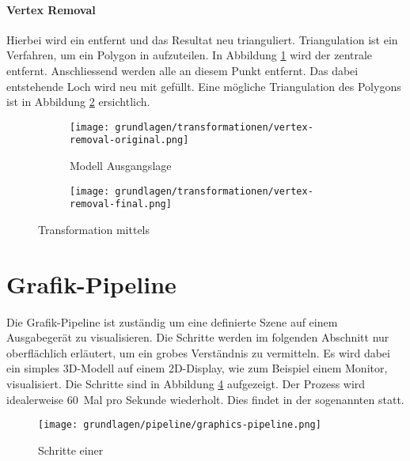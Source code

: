 \paragraph{Vertex Removal}
Hierbei wird ein  entfernt und das Resultat neu trianguliert. Triangulation ist ein Verfahren, um ein Polygon in  aufzuteilen.
In Abbildung \ref{fig:transformationVertexRemovalOriginal} wird der zentrale  entfernt. Anschliessend werden alle  an diesem Punkt entfernt. Das dabei entstehende Loch wird neu mit  gefüllt. Eine mögliche Triangulation des Polygons ist in Abbildung \ref{fig:transformationVertexRemovalFinal} ersichtlich.

\begin{figure}[H]
  \centering
  \begin{subfigure}{.5\textwidth}
    \centering
    \texttt{[image: grundlagen/transformationen/vertex-removal-original.png]}
    \caption{Modell Ausgangslage}
    \label{fig:transformationVertexRemovalOriginal}
  \end{subfigure}%
  \begin{subfigure}{.5\textwidth}
    \centering
    \texttt{[image: grundlagen/transformationen/vertex-removal-final.png]}
    \caption{}
    \label{fig:transformationVertexRemovalFinal}
  \end{subfigure}
  \caption{Transformation mittels }
  \label{fig:transformationVertexRemoval}
\end{figure}

\section{Grafik-Pipeline}

Die Grafik-Pipeline ist zuständig um eine definierte Szene auf einem Ausgabegerät zu visualisieren. Die Schritte werden im folgenden Abschnitt nur oberflächlich erläutert, um ein grobes Verständnis zu vermitteln. Es wird dabei ein simples 3D-Modell auf einem 2D-Display, wie zum Beispiel einem Monitor, visualisiert. Die Schritte sind in Abbildung \ref{fig:renderingPipelineOverview} aufgezeigt. Der Prozess wird idealerweise 60 Mal pro Sekunde wiederholt. Dies findet in der sogenannten  statt.

\begin{figure}[H]
  \centering
  \texttt{[image: grundlagen/pipeline/graphics-pipeline.png]}
  \caption{Schritte einer }
  \label{fig:renderingPipelineOverview}
\end{figure}

